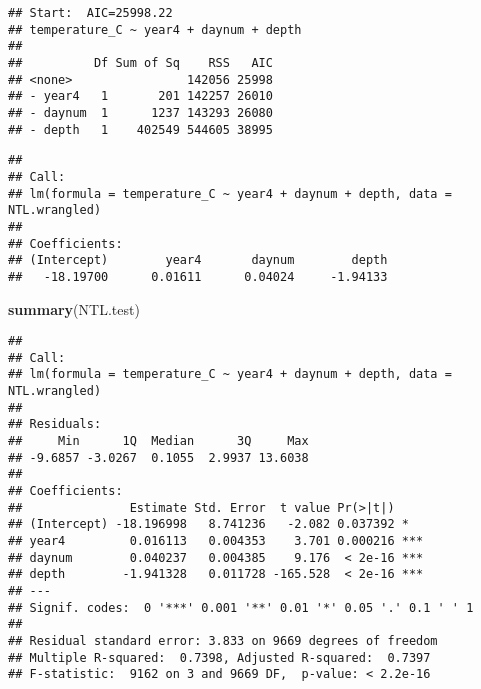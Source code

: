 \documentclass[]{article}
\newenvironment{Shaded}{\begin{snugshade}}{\end{snugshade}}
\newcommand{\KeywordTok}[1]{\textcolor[rgb]{0.13,0.29,0.53}{\textbf{#1}}}
\newcommand{\DataTypeTok}[1]{\textcolor[rgb]{0.13,0.29,0.53}{#1}}
\newcommand{\DecValTok}[1]{\textcolor[rgb]{0.00,0.00,0.81}{#1}}
\newcommand{\StringTok}[1]{\textcolor[rgb]{0.31,0.60,0.02}{#1}}
\newcommand{\CommentTok}[1]{\textcolor[rgb]{0.56,0.35,0.01}{\textit{#1}}}
\newcommand{\OperatorTok}[1]{\textcolor[rgb]{0.81,0.36,0.00}{\textbf{#1}}}
\newcommand{\NormalTok}[1]{#1}
\begin{document}
\begin{Shaded}
\end{Shaded}

\begin{verbatim}
## Start:  AIC=25998.22
## temperature_C ~ year4 + daynum + depth
## 
##          Df Sum of Sq    RSS   AIC
## <none>                142056 25998
## - year4   1       201 142257 26010
## - daynum  1      1237 143293 26080
## - depth   1    402549 544605 38995
\end{verbatim}

\begin{verbatim}
## 
## Call:
## lm(formula = temperature_C ~ year4 + daynum + depth, data = NTL.wrangled)
## 
## Coefficients:
## (Intercept)        year4       daynum        depth  
##   -18.19700      0.01611      0.04024     -1.94133
\end{verbatim}

\begin{Shaded}
\begin{Highlighting}[]
\KeywordTok{summary}\NormalTok{(NTL.test)}
\end{Highlighting}
\end{Shaded}

\begin{verbatim}
## 
## Call:
## lm(formula = temperature_C ~ year4 + daynum + depth, data = NTL.wrangled)
## 
## Residuals:
##     Min      1Q  Median      3Q     Max 
## -9.6857 -3.0267  0.1055  2.9937 13.6038 
## 
## Coefficients:
##               Estimate Std. Error  t value Pr(>|t|)    
## (Intercept) -18.196998   8.741236   -2.082 0.037392 *  
## year4         0.016113   0.004353    3.701 0.000216 ***
## daynum        0.040237   0.004385    9.176  < 2e-16 ***
## depth        -1.941328   0.011728 -165.528  < 2e-16 ***
## ---
## Signif. codes:  0 '***' 0.001 '**' 0.01 '*' 0.05 '.' 0.1 ' ' 1
## 
## Residual standard error: 3.833 on 9669 degrees of freedom
## Multiple R-squared:  0.7398, Adjusted R-squared:  0.7397 
## F-statistic:  9162 on 3 and 9669 DF,  p-value: < 2.2e-16
\end{verbatim}
\end{document}
